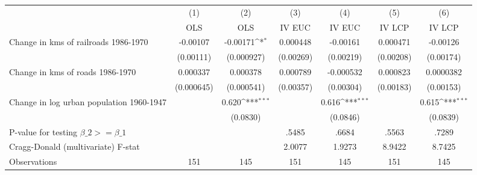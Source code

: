 {
\def\sym#1{\ifmmode^{#1}\else\(^{#1}\)\fi}
\begin{tabular}{l*{6}{c}}
\hline\hline
                &\multicolumn{1}{c}{(1)}&\multicolumn{1}{c}{(2)}&\multicolumn{1}{c}{(3)}&\multicolumn{1}{c}{(4)}&\multicolumn{1}{c}{(5)}&\multicolumn{1}{c}{(6)}\\
                &\multicolumn{1}{c}{OLS}&\multicolumn{1}{c}{OLS}&\multicolumn{1}{c}{IV EUC}&\multicolumn{1}{c}{IV EUC}&\multicolumn{1}{c}{IV LCP}&\multicolumn{1}{c}{IV LCP}\\
\hline
Change in kms of railroads 1986-1970& -0.00107         & -0.00171\sym{*}  & 0.000448         & -0.00161         & 0.000471         & -0.00126         \\
                &(0.00111)         &(0.000927)         &(0.00269)         &(0.00219)         &(0.00208)         &(0.00174)         \\
[1em]
Change in kms of roads 1986-1970& 0.000337         & 0.000378         & 0.000789         &-0.000532         & 0.000823         &0.0000382         \\
                &(0.000645)         &(0.000541)         &(0.00357)         &(0.00304)         &(0.00183)         &(0.00153)         \\
[1em]
Change in log urban population 1960-1947&                  &    0.620\sym{***}&                  &    0.616\sym{***}&                  &    0.615\sym{***}\\
                &                  & (0.0830)         &                  & (0.0846)         &                  & (0.0839)         \\
\hline
P-value for testing $\beta\_{2} >= \beta\_{1}$&                  &                  &    .5485         &    .6684         &    .5563         &    .7289         \\
Cragg-Donald (multivariate) F-stat&                  &                  &   2.0077         &   1.9273         &   8.9422         &   8.7425         \\
Observations    &      151         &      145         &      151         &      145         &      151         &      145         \\
\hline\hline
\end{tabular}
}
